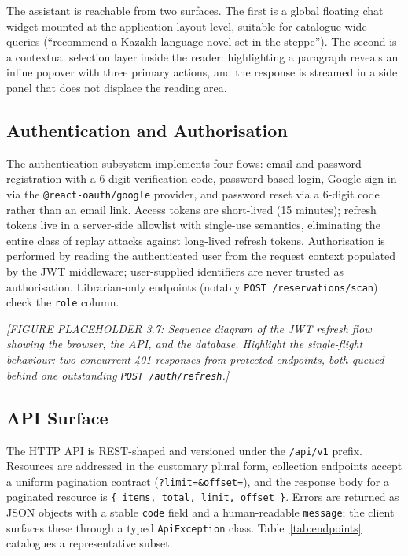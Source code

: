 \documentclass[12pt,a4paper]{report}
\begin{document}
The assistant is reachable from two surfaces. The first is a global
floating chat widget mounted at the application layout level, suitable
for catalogue-wide queries (``recommend a Kazakh-language novel set in
the steppe''). The second is a contextual selection layer inside the
reader: highlighting a paragraph reveals an inline popover with three
primary actions, and the response is streamed in a side panel that does
not displace the reading area.

\subsection{Authentication and Authorisation}

The authentication subsystem implements four flows: email-and-password
registration with a 6-digit verification code, password-based login,
Google sign-in via the \texttt{@react-oauth/google} provider, and
password reset via a 6-digit code rather than an email link. Access
tokens are short-lived (15 minutes); refresh tokens live in a
server-side allowlist with single-use semantics, eliminating the entire
class of replay attacks against long-lived refresh tokens. Authorisation
is performed by reading the authenticated user from the request context
populated by the JWT middleware; user-supplied identifiers are never
trusted as authorisation. Librarian-only endpoints (notably
\texttt{POST /reservations/scan}) check the \texttt{role} column.

\textit{[FIGURE PLACEHOLDER 3.7: Sequence diagram of the JWT refresh
flow showing the browser, the API, and the database. Highlight the
single-flight behaviour: two concurrent 401 responses from protected
endpoints, both queued behind one outstanding
\texttt{POST /auth/refresh}.]}

\subsection{API Surface}

The HTTP API is REST-shaped and versioned under the \texttt{/api/v1}
prefix. Resources are addressed in the customary plural form,
collection endpoints accept a uniform pagination contract
(\texttt{?limit=\&offset=}), and the response body for a paginated
resource is \texttt{\{ items, total, limit, offset \}}. Errors are
returned as JSON objects with a stable \texttt{code} field and a
human-readable \texttt{message}; the client surfaces these through a
typed \texttt{ApiException} class. Table~\ref{tab:endpoints} catalogues
a representative subset.
\end{document}
